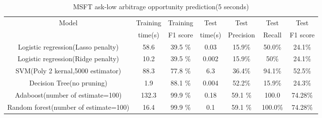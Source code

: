 \begin{table}[htp!]
	\caption{MSFT ask-low arbitrage opportunity prediction(5 seconds)}
	\label{ask_low_prediction}
	\begin{center}
		\begin{tabular}{|c|c|c|c|c|c|c|}
			\hline
			 Model& Training & Training  & Test  & Test & Test & Test \\[5pt]
			 & time(s) & F1 score & time(s) & Precision & Recall & F1 score \\[5pt]
			 \hline
			 Logistic regression(Lasso penalty)& 58.6 & 39.5 \% & 0.03 & 15.9\% & 50.0\%& 24.1\%\\[5pt]
			 Logistic regression(Ridge penalty)& 10.2 & 39.5 \% & 0.002 &  15.9\% & 50\%& 24.1\%\\[5pt]
			 SVM(Poly 2 kernal,5000 estimator)& 88.3 & 77.8 \% & 6.3 &  36.4\% & 94.1\%& 52.5\%\\[5pt]
			 Decision Tree(no pruning)& 1.9 & 88.1 \% & 0.004 &  52.2\% & 15.9\%& 24.3\%\\[5pt]
			 Adaboost(number of estimate=100)& 132.3 & 99.9 \% & 0.18 & 59.1 \% & 100.0 &  74.28\% \\[5pt]
			 Random forest(number of estimate=100)& 16.4 & 99.9 \% & 0.1 & 59.1 \% & 100.0\% &  74.28\% \\[5pt]		 	
	 		\hline 
		\end{tabular}
	\end{center}
\end{table}
